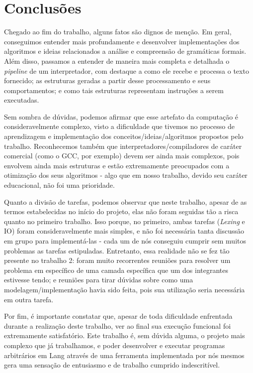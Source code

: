 \documentclass{article}
\begin{document}
\section{Conclusões}

Chegado ao fim do trabalho, alguns fatos são dignos de menção. Em geral, conseguimos entender mais profundamente e desenvolver implementações dos algoritmos e ideias relacionados a análise e compreensão de gramáticas formais. Além disso, passamos a entender de maneira mais completa e detalhada o \textit{pipeline} de um interpretador, com destaque a como ele recebe e processa o texto fornecido; as estruturas geradas a partir desse processamento e seus comportamentos; e como tais estruturas representam instruções a serem executadas.

Sem sombra de dúvidas, podemos afirmar que esse artefato da computação é consideravelmente complexo, visto a dificuldade que tivemos no processo de aprendizagem e implementação dos conceitos/ideias/algoritmos propostos pelo trabalho. Reconhecemos também que interpretadores/compiladores de caráter comercial (como o GCC, por exemplo) devem ser ainda mais complexos, pois envolvem ainda mais estruturas e estão extremamente preocupados com a otimização dos seus algoritmos - algo que em nosso trabalho, devido seu caráter educacional, não foi uma prioridade.

Quanto a divisão de tarefas, podemos observar que neste trabalho, apesar de as termos estabelecidas no início do projeto, elas não foram seguidas tão a risca quanto no primeiro trabalho. Isso porque, no primeiro, ambas tarefas (\textit{Lexing} e IO) foram consideravelmente mais simples, e não foi necessária tanta discussão em grupo para implementá-las - cada um de nós conseguiu cumprir sem muitos problemas as tarefas estipuladas. Entretanto, essa realidade não se fez tão presente no trabalho 2: foram muito recorrentes reuniões para resolver um problema em específico de uma camada específica que um dos integrantes estivesse tendo; e reuniões para tirar dúvidas sobre como uma modelagem/implementação havia sido feita, pois sua utilização seria necessária em outra tarefa.

Por fim, é importante constatar que, apesar de toda dificuldade enfrentada durante a realização deste trabalho, ver ao final sua execução funcional foi extremamente satisfatório. Este trabalho é, sem dúvida alguma, o projeto mais complexo que já trabalhamos, e poder desenvolver e executar programas arbitrários em Lang através de uma ferramenta implementada por nós mesmos gera uma sensação de entusiasmo e de trabalho cumprido indescritível.
\end{document}

